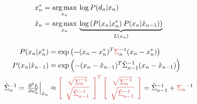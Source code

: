 \begin{algorithm}
\begin{equation*}
\begin{aligned}
x_n^* &= \operatorname*{arg\,max}_{x_n} \: \log P(d_n|x_n) 
\\
\hat{x}_n &= \operatorname*{arg\,max}_{x_n} \: \underbrace{\log \left( P(x_n|x_n^*) \: P(x_n |\hat{x}_{n - 1}) \right)}_{L(x_n)}    
\\
\end{aligned}
\end{equation*}

\begin{equation*}
\begin{aligned}
P(x_n |x_n^*) &= \exp \left( - (x_n - x_n^* )^T \todo{\Sigma}_n^{-1}(x_n - x_n^* )\right)
\\
P(x_n |\hat{x}_{n - 1}) &= 
\exp \left( - (x_n - \hat{x}_{n - 1} )^T \hat{\Sigma}_{n - 1}^{-1} (x_n - \hat{x}_{n - 1} )\right)
\\
\hat{\Sigma}_n^{-1} = 
\left.\tfrac{\partial^2 L}{\partial x_n^2}\right|_{\hat{x}_n} &\approx 
\todo{
\left[
    \begin{array}{cc}
        \sqrt{\Sigma_n^{-1}} \\
        \sqrt{\hat{\Sigma}_{n - 1}^{-1}} \\
    \end{array}
\right]^T
\left[
    \begin{array}{c}
        \sqrt{\Sigma_n^{-1}} \\
        \sqrt{\hat{\Sigma}_{n - 1}^{-1}} \\
    \end{array}
\right]
} %
=
\hat{\Sigma}_{n-1}^{-1}  + \todo{\Sigma_{n}}^{-1}
\end{aligned}
\end{equation*}
\caption{
% 
% 
Inter-frame regression formulated as a KF. 
% 
% 
}
\label{alg:interframe}
\label{alg:kf-like} %
\label{tab:kf-like} %
\end{algorithm}